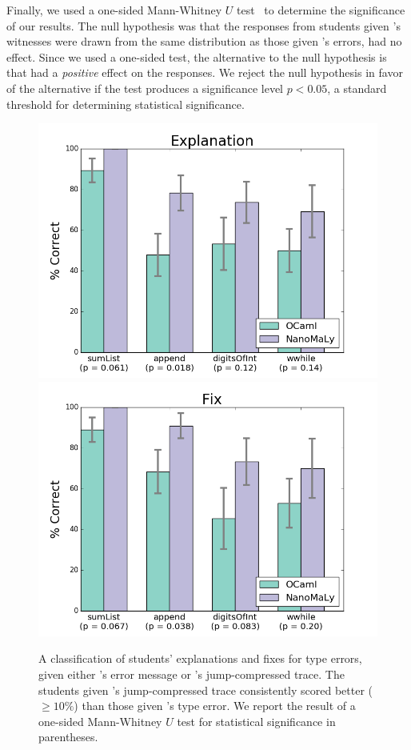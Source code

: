 Finally, we used a one-sided Mann-Whitney $U$ test~\cite{Mann1947-fd} to
determine the significance of our results.
%
The null hypothesis was that the responses from students given
\toolname's witnesses were drawn from the same distribution as those
given \ocaml's errors, \ie \toolname had no effect.
%
Since we used a one-sided test, the alternative to the null hypothesis
is that \toolname had a \emph{positive} effect on the responses.
%
We reject the null hypothesis in favor of the alternative if the test
produces a significance level $p < 0.05$, a standard threshold for
determining statistical significance.

\begin{figure}[t]
\includegraphics[width=0.7\linewidth]{user-study-reason.png}
\includegraphics[width=0.7\linewidth]{user-study-fix.png}
\caption{A classification of students' explanations and fixes for type
  errors, given either \ocaml's error message or \toolname's
  jump-compressed trace. The students given \toolname's jump-compressed
  trace consistently scored better ($\ge 10\%$) than those given
  \ocaml's type error. We report the result of a one-sided Mann-Whitney
  $U$ test for statistical significance in parentheses.}
\label{fig:results-user-study}
\end{figure}


